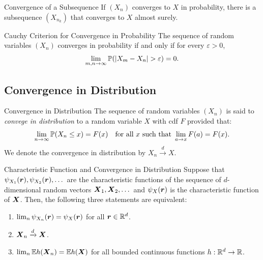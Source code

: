 \begin{prop}{Convergence of a Subsequence}{}
	If \((X_n)\) converges to \(X\) in probability, there is a subsequence \((X_{n_k})\) that converges to \(X\) almost surely.
\end{prop}

\begin{prop}{Cauchy Criterion for Convergence in Probability}{}
	The sequence of random variables \((X_n)\) converges in probability if and only if for every \(\varepsilon > 0\),
	\begin{equation}
		\lim_{m,n \to \infty} \mathbb{P}(|X_m - X_n| > \varepsilon) = 0.
		\label{eq:CauchyCriterionProbability}
	\end{equation}
\end{prop}

\subsection{Convergence in Distribution}
\begin{defn}{Convergence in Distribution}{}
	The sequence of random variables \((X_n)\) is said to \textit{convege in distribution} to a random variable \(X\) with cdf \(F\) provided that:
	\begin{equation}
		\lim_{n \to \infty} \mathbb{P}(X_n \le x) = F(x) \quad \text{for all } x \text{ such that } \lim_{a \to x} F(a) = F(x).
		\label{eq:ConvergenceInDistributionDef}
	\end{equation}
	We denote the convergence in distribution by \(X_n \xrightarrow{d} X\).
\end{defn}

\begin{thm}{Characteristic Function and Convergence in Distribution}{}
	Suppose that \(\psi_{X_1}(\boldsymbol{r}), \psi_{X_2}(\boldsymbol{r}), \dots\) are the characteristic functions of the sequence of \(d\)-dimensional random vectors \(\boldsymbol{X}_1, \boldsymbol{X}_2, \dots\) and \(\psi_X(\boldsymbol{r})\) is the characteristic function of \(\boldsymbol{X}\). Then, the following three statements are equivalent:
	\begin{enumerate}
		\item \(\lim_{n} \psi_{X_n}(\boldsymbol{r}) = \psi_X(\boldsymbol{r})\) for all \(\boldsymbol{r} \in \mathbb{R}^d\).
		\item \(\boldsymbol{X}_n \xrightarrow{d} \boldsymbol{X}\).
		\item \(\lim_n \mathbb{E} h(\boldsymbol{X}_n) = \mathbb{E} h(\boldsymbol{X})\) for all bounded continuous functions \(h: \mathbb{R}^d \to \mathbb{R}\).
	\end{enumerate}
\end{thm}

